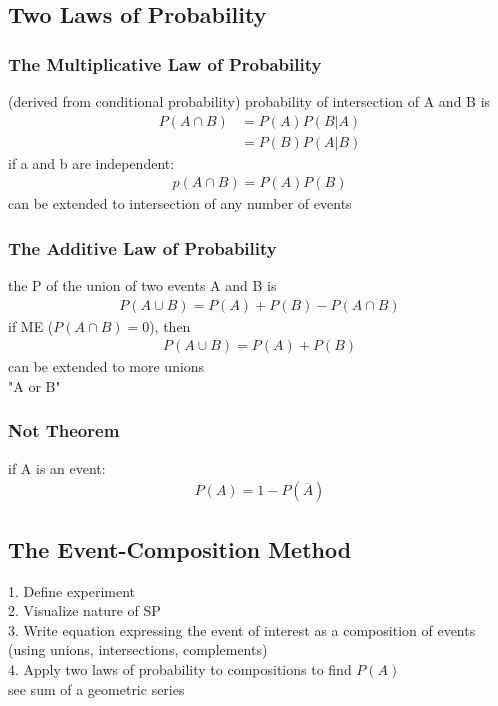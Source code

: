 \documentclass[12pt]{article}
\begin{document}
\subsection{Two Laws of Probability}
    \subsubsection{The Multiplicative Law of Probability}
        (derived from conditional probability)
        probability of intersection of A and B is
        \begin{align*}
            P(A\cap B) &=  P(A)P(B|A)\\
                       &= P(B)P(A|B)
        \end{align*}
        if a and b are independent:
        \begin{align*}
            p(A\cap B) = P(A)P(B)
        \end{align*}
        can be extended to intersection of any number of events
    \subsubsection{The Additive Law of Probability}
        the P of the union of two events A and B is
        \begin{align*}
            P(A\cup B) = P(A) + P(B) - P(A\cap B)
        \end{align*}
        if ME ($ P(A\cap B) = 0 $), then
        \begin{align*}
            P(A\cup B) = P(A) + P(B)
        \end{align*}
        can be extended to more unions\\
        "A or B"
    \subsubsection{Not Theorem}
        if A is an event:
        \begin{align*}
            P(A) = 1-P(\overline{A})
        \end{align*}
\subsection{The Event-Composition Method}
    1. Define experiment\\
    2. Visualize nature of SP \\
    3. Write equation expressing the event of interest as a composition
    of events (using unions, intersections, complements)\\
    4. Apply two laws of probability to compositions to find $ P(A) $\\
    see sum of a geometric series
\end{document}
